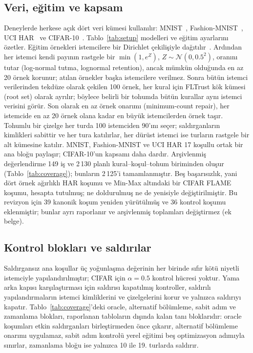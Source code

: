 \documentclass[journal]{IEEEtran}
\begin{document}
\subsection{Veri, eğitim ve kapsam}
Deneylerde herkese açık dört veri kümesi kullanılır: MNIST~\cite{lecun1998}, Fashion-MNIST~\cite{xiao2017fmnist}, UCI HAR~\cite{anguita2013har} ve CIFAR-10~\cite{krizhevsky2009}. Tablo~\ref{tab:setup} modelleri ve eğitim ayarlarını özetler. Eğitim örnekleri istemcilere bir Dirichlet çekilişiyle dağıtılır~\cite{hsu2019}. Ardından her istemci kendi payının rastgele bir $\min(1,e^{Z})$, $Z\sim\mathcal{N}(0,0.5^2)$, oranını tutar (log-normal tutma, lognormal retention), ancak mümkün olduğunda en az 20 örnek korunur; atılan örnekler başka istemcilere verilmez. Sonra bütün istemci verilerinden tekdüze olarak çekilen 100 örnek, her kural için FLTrust kök kümesi (root set) olarak ayrılır; böylece belirli bir tohumda bütün kurallar aynı istemci verisini görür. Son olarak en az örnek onarımı (minimum-count repair), her istemcide en az 20 örnek olana kadar en büyük istemcilerden örnek taşır. Tohumlu bir çizelge her turda 100 istemciden 90'ını seçer; saldırganların kimlikleri sabittir ve her tura katılırlar, her dürüst istemci ise turların rastgele bir alt kümesine katılır. MNIST, Fashion-MNIST ve UCI HAR 17 koşullu ortak bir ana bloğu paylaşır; CIFAR-10'un kapsamı daha dardır. Arşivlenmiş değerlendirme 149 iş ve 2\,130 planlı kural--koşul--tohum biriminden oluşur (Tablo~\ref{tab:coverage}); bunların 2\,125'i tamamlanmıştır. Beş başarısızlık, yani dört örnek ağırlıklı HAR koşumu ve Min-Max altındaki bir CIFAR FLAME koşumu, hesapta tutulmuş; ne doldurulmuş ne de yenisiyle değiştirilmiştir. Bu revizyon için 39 kanonik koşum yeniden yürütülmüş ve 36 kontrol koşumu eklenmiştir; bunlar ayrı raporlanır ve arşivlenmiş toplamları değiştirmez (ek belge).

\subsection{Kontrol blokları ve saldırılar}
Saldırgansız ana koşullar üç yoğunlaşma değerinin her birinde sıfır kötü niyetli istemciyle yapılandırılmıştır; CIFAR için $\alpha=0.5$ kontrol hücresi yoktur. Yama arka kapısı karşılaştırması için saldırısı kapatılmış kontroller, saldırılı yapılandırmaların istemci kimliklerini ve çizelgelerini korur ve yalnızca saldırıyı kapatır. Tablo~\ref{tab:coverage}'deki oracle, alternatif bölümleme, sabit adım ve zamanlama blokları, raporlanan tabloların dışında kalan tanı bloklarıdır: oracle koşumları etkin saldırganları birleştirmeden önce çıkarır, alternatif bölümleme onarımı uygulamaz, sabit adım kontrolü yerel eğitimi beş optimizasyon adımıyla sınırlar, zamanlama bloğu ise yalnızca 10 ile 19. turlarda saldırır.
\end{document}
